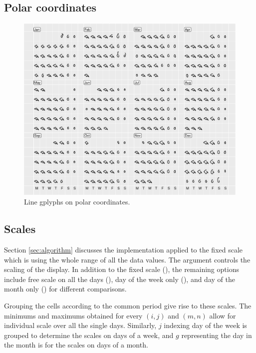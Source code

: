 \documentclass[article]{jss}
\begin{document}
\subsection{Polar coordinates}\label{polar-coordinates}

\begin{CodeChunk}
\begin{figure}

{\centering \includegraphics[width=\textwidth]{figure/flinders-polar-1} 

}

\caption[Line gplyphs on polar coordinates]{Line gplyphs on polar coordinates.}\label{fig:flinders-polar}
\end{figure}
\end{CodeChunk}

\subsection{Scales}\label{scales}

Section \ref{sec:algorithm} discusses the implementation applied to the
fixed scale which is using the whole range of all the data values. The
 argument controls the scaling of the display. In addition
to the fixed scale (), the remaining options include free
scale on all the days (), day of the week only
(), and day of the month only () for
different comparisons.

Grouping the cells according to the common period give rise to these
scales. The minimums and maximums obtained for every \((i, j)\) and
\((m, n)\) allow for individual scale over all the single days.
Similarly, \(j\) indexing day of the week is grouped to determine the
scales on days of a week, and \(g\) representing the day in the month is
for the scales on days of a month.
\end{document}
